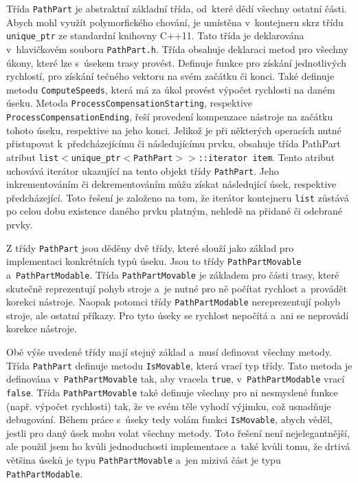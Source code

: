 		Třída {\tt PathPart} je abstraktní základní třída, od~které dědí všechny ostatní části. Abych mohl využít polymorfického chování, je umístěna v~kontejneru skrz třídu {\tt unique\_ptr} ze standardní knihovny C++11. Tato třída je deklarována v~hlavičkovém souboru {\tt PathPart.h}. Třída obsahuje deklaraci metod pro všechny úkony, které lze s~úsekem trasy provést. Definuje funkce pro získání jednotlivých rychlostí, pro získání tečného vektoru na svém začátku či konci. Také definuje metodu {\tt ComputeSpeeds}, která má za úkol provést výpočet rychlosti na daném úseku. Metoda {\tt ProcessCompensationStarting}, respektive {\tt ProcessCompensationEnding}, řeší provedení kompenzace nástroje na začátku tohoto úseku, respektive na jeho konci. Jelikož je při některých operacích nutné přistupovat k~předcházejícímu či následujícímu prvku, obsahuje třída PathPart atribut {\tt list$<$unique\_ptr$<$PathPart$>>$::iterator item}. Tento atribut uchovává iterátor ukazující na tento objekt třídy {\tt PathPart}. Jeho inkrementováním či dekrementováním můžu získat následující úsek, respektive předcházející. Toto řešení je založeno na tom, že iterátor kontejneru {\tt list} zůstává po celou dobu existence daného prvku platným, nehledě na přidané či odebrané prvky.
		
		Z třídy {\tt PathPart} jsou děděny dvě třídy, které slouží jako základ pro implementaci konkrétních typů úseku. Jsou to třídy {\tt PathPartMovable} a~{\tt PathPartModable}. Třída {\tt PathPartMovable} je základem pro části trasy, které skutečně reprezentují pohyb stroje a~je nutné pro ně počítat rychlost a~provádět korekci nástroje. Naopak potomci třídy {\tt PathPartModable} nereprezentují pohyb stroje, ale ostatní příkazy. Pro tyto úseky se rychlost nepočítá a~ani se neprovádí korekce nástroje. 
		
		Obě výše uvedené třídy mají stejný základ a~musí definovat všechny metody. Třída {\tt PathPart} definuje metodu {\tt IsMovable}, která vrací typ třídy. Tato metoda je definována v~{\tt PathPartMovable} tak, aby vracela {\tt true}, v~{\tt PathPartModable} vrací {\tt false}. Třída {\tt PathPartMovable} také definuje všechny pro ni nesmyslené funkce (např. výpočet rychlosti) tak, že ve svém těle vyhodí výjimku, což usnadňuje debugování. Během práce s~úseky tedy volám funkci {\tt IsMovable}, abych věděl, jestli pro daný úsek mohu volat všechny metody. Toto řešení není nejelegantnější, ale použil jsem ho kvůli jednoduchosti implementace a~také kvůli tomu, že drtivá většina úseků je typu {\tt PathPartMovable} a~jen mizivá část je typu {\tt PathPartModable}.
		
